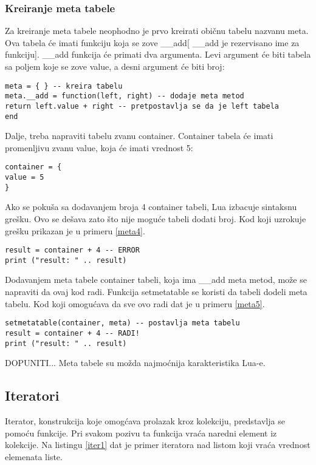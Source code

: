 \documentclass[a4paper]{article}
\begin{document}
\subsubsection*{Kreiranje meta tabele}
Za kreiranje meta tabele neophodno je prvo kreirati običnu tabelu nazvanu meta. Ova tabela će imati funkciju koja se zove \_\_add[ \_\_add je rezervisano ime za funkciju]. \_\_add funkcija će primati dva argumenta. Levi argument će biti tabela sa poljem koje se zove value, a desni argument će biti broj:
\begin{lstlisting}[caption={Metatabela},frame=single, label=meta2]
meta = { } -- kreira tabelu
meta.__add = function(left, right) -- dodaje meta metod
return left.value + right -- pretpostavlja se da je left tabela
end
\end{lstlisting}
Dalje, treba napraviti tabelu zvanu container. Container tabela će imati promenljivu zvanu value, koja će imati vrednost 5:
\begin{lstlisting}[caption={Metatabela},frame=single, label=meta3]
container = {
value = 5
}
\end{lstlisting}
Ako se pokuša sa dodavanjem broja 4 container tabeli, Lua izbacuje sintaksnu grešku. Ovo se dešava zato što nije moguće tabeli dodati broj. Kod koji uzrokuje grešku prikazan je u primeru \ref{meta4}.
\begin{lstlisting}[caption={Metatabela},frame=single, label=meta4]
result = container + 4 -- ERROR
print ("result: " .. result)
\end{lstlisting}
Dodavanjem meta tabele container tabeli, koja ima \_\_add meta metod, može se napraviti da ovaj kod radi. Funkcija setmetatable se koristi da tabeli dodeli meta tabelu. Kod koji omogućava da sve ovo radi dat je u primeru \ref{meta5}.
\begin{lstlisting}[caption={Metatabela},frame=single, label=meta5]
setmetatable(container, meta) -- postavlja meta tabelu
result = container + 4 -- RADI!
print ("result: " .. result)
\end{lstlisting}
DOPUNITI... Meta tabele su možda najmoćnija karakteristika Lua-e.


\subsection*{Iteratori}

Iterator, konstrukcija koje omogćava prolazak kroz kolekciju, predstavlja se pomoću funkcije. Pri svakom pozivu ta funkcija vraća naredni element iz kolekcije. Na listingu \ref{iter1} dat je primer iteratora nad listom koji vraća vrednost elemenata liste.
\end{document}
